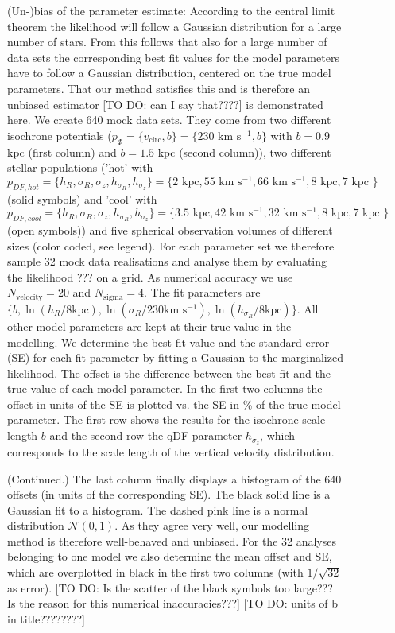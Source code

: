 \documentclass[12pt,preprint]{aastex}
\begin{document}

\begin{figure}
\caption{(Un-)bias of the parameter estimate: According to the central limit theorem the likelihood will follow a Gaussian distribution for a large number of stars. From this follows that also for a large number of data sets the corresponding best fit values for the model parameters have to follow a Gaussian distribution, centered on the true model parameters. That our method satisfies this and is therefore an unbiased estimator [TO DO: can I say that????] is demonstrated here. We create 640 mock data sets. They come from two different isochrone potentials ($p_\Phi = \{v_\text{circ},b \}=\{230 \text{ km s$^{-1}$},b \}$ with $b = 0.9$ kpc (first column) and $b = 1.5$ kpc (second column)), two different stellar populations ('hot' with $p_{DF,hot} = \{ h_R, \sigma_R, \sigma_z,h_{\sigma_R},h_{\sigma_z}\} =\{2 \text{ kpc}, 55 \text{ km s$^{-1}$}, 66 \text{ km s$^{-1}$}, 8 \text{ kpc}, 7 \text{ kpc }\} $ (solid symbols) and 'cool' with $p_{DF,cool} = \{ h_R, \sigma_R, \sigma_z,h_{\sigma_R},h_{\sigma_z}\} =\{3.5 \text{ kpc}, 42 \text{ km s$^{-1}$}, 32 \text{ km s$^{-1}$}, 8 \text{ kpc}, 7 \text{ kpc }\} $ (open symbols)) and five spherical observation volumes of different sizes (color coded, see legend). For each parameter set we therefore sample 32 mock data realisations and analyse them by evaluating the likelihood ??? on a grid. As numerical accuracy we use $N_\text{velocity} = 20$ and $N_\text{sigma} = 4$. The fit parameters are $\{b,\ln(h_R/8\text{kpc}),\ln(\sigma_{R}/230 \text{km s$^{-1}$}),\ln(h_{\sigma_R}/8\text{kpc}) \}$. All other model parameters are kept at their true value in the modelling. We determine the best fit value and the standard error (SE) for each fit parameter by fitting a Gaussian to the marginalized likelihood. The offset is the difference between the best fit and the true value of each model parameter. In the first two columns the offset in units of the SE is plotted vs. the SE in \% of the true model parameter. The first row shows the results for the isochrone scale length $b$ and the second row the qDF parameter $h_{\sigma_z}$, which corresponds to the scale length of the vertical velocity distribution. }
\label{fig:centrallimittheorem}
\end{figure}

\addtocounter{figure}{-1}
\begin{figure} [t!]
  \caption{(Continued.) The last column finally displays a histogram of the 640 offsets (in units of the corresponding SE). The black solid line is a Gaussian fit to a histogram. The dashed pink line is a normal distribution $\mathscr{N}(0,1)$. As they agree very well, our modelling method is therefore well-behaved and unbiased. For the 32 analyses belonging to one model we also determine the mean offset and SE, which are overplotted in black in the first two columns (with $1/\sqrt{32}$ as error).  [TO DO: Is the scatter of the black symbols too large??? Is the reason for this numerical inaccuracies???] [TO DO: units of b in title????????]} 
  \end{figure}
  
\end{document}
